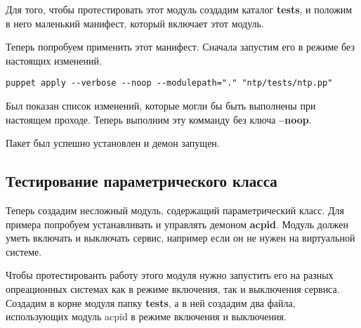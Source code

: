 

Для того, чтобы протестировать этот модуль создадим каталог \textbf{tests}, и положим в него маленький манифест, который включает этот модуль.




Теперь попробуем применить этот манифест. Сначала запустим его в режиме без настоящих изменений.

\begin{verbatim}
puppet apply --verbose --noop --modulepath="." "ntp/tests/ntp.pp"
\end{verbatim}


Был показан список изменений, которые могли бы быть выполнены при настоящем проходе. Теперь выполним эту комманду без ключа \textbf{--noop}.


Пакет был успешно установлен и демон запущен.

\subsection{Тестирование параметрического класса}

Теперь создадим несложный модуль, содержащий параметрический класс. Для примера попробуем устанавливать и управлять демоном \textbf{acpid}. Модуль должен уметь включать и выключать сервис, например если он не нужен на виртуальной системе.



Чтобы протестированть работу этого модуля нужно запустить его на разных опреационных системах как в режиме включения, так и выключения сервиса. Создадим в корне модуля папку \textbf{tests}, а в ней создадим два файла, использующих модуль acpid в режиме включения и выключения.






